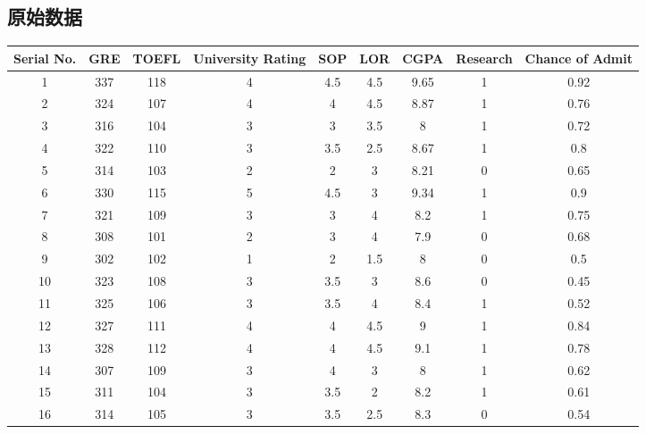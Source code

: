 \documentclass[11pt]{article}
\begin{document}
\begin{appendix}
	\section{原始数据}
	\begin{longtable}[H]{|c|c|c|c|c|c|c|c|c|}
	\hline
	Serial No. & GRE & TOEFL & University Rating & SOP & LOR & CGPA & Research & Chance of Admit\\ \hline
	1          & 337& 118 & 4 & 4.5 & 4.5 & 9.65 & 1        & 0.92            \\ \hline
	2          & 324& 107  & 4 & 4   & 4.5 & 8.87 & 1        & 0.76            \\ \hline
	3          & 316  & 104 & 3   & 3   & 3.5 & 8    & 1        & 0.72            \\ \hline
	4          & 322   & 110  & 3   & 3.5 & 2.5 & 8.67 & 1        & 0.8             \\ \hline
	5          & 314       & 103  & 2& 2   & 3   & 8.21 & 0        & 0.65            \\ \hline
	6          & 330       & 115   & 5 & 4.5 & 3   & 9.34 & 1        & 0.9             \\ \hline
	7          & 321       & 109  & 3   & 3   & 4   & 8.2  & 1        & 0.75            \\ \hline
	8          & 308       & 101   & 2 & 3   & 4   & 7.9  & 0        & 0.68            \\ \hline
	9          & 302       & 102 & 1 & 2   & 1.5 & 8    & 0        & 0.5             \\ \hline
	10         & 323       & 108  & 3   & 3.5 & 3   & 8.6  & 0        & 0.45            \\ \hline
	11         & 325       & 106  & 3   & 3.5 & 4   & 8.4  & 1        & 0.52            \\ \hline
	12         & 327       & 111  & 4 & 4   & 4.5 & 9    & 1        & 0.84            \\ \hline
	13         & 328       & 112         & 4   & 4   & 4.5 & 9.1  & 1        & 0.78            \\ \hline
	14         & 307       & 109         & 3  & 4   & 3   & 8    & 1        & 0.62            \\ \hline
	15         & 311       & 104         & 3  & 3.5 & 2   & 8.2  & 1        & 0.61            \\ \hline
	16         & 314       & 105         & 3  & 3.5 & 2.5 & 8.3  & 0        & 0.54            \\ \hline

\end{longtable}
\end{appendix}
\end{document}
